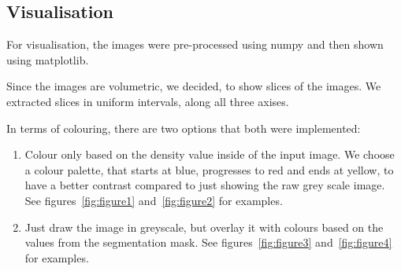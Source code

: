 \documentclass{article}
\begin{document}
		\subsection{Visualisation}

			For visualisation, the images were pre-processed using numpy and then shown using matplotlib.

			Since the images are volumetric, we decided, to show slices of the images. We extracted slices in uniform intervals, along all three axises.

			In terms of colouring, there are two options that both were implemented: 
			\begin{enumerate}
				\item Colour only based on the density value inside of the input image. We choose a colour palette, that starts at blue, progresses to red and ends at yellow, to have a better contrast compared to just showing the raw grey scale image. See figures~\ref{fig:figure1} and~\ref{fig:figure2} for examples.
				\item Just draw the image in greyscale, but overlay it with colours based on the values from the segmentation mask. See figures~\ref{fig:figure3} and~\ref{fig:figure4} for examples.
			\end{enumerate}
\end{document}
